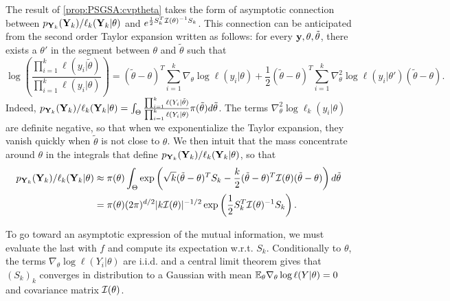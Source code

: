         The result of \cref{prop:PSGSA:cvptheta} takes the form of asymptotic connection between $p_{\mathbf{Y}_k}(\mathbf{Y}_k)/\ell_k(\mathbf{Y}_k|\theta) $ and $e^{\frac{1}{2}S_k^T\mathcal{I}(\theta)^{-1}S_k}$. This connection can be anticipated from the second order Taylor expansion written as follows: for every $\mathbf{y},\theta, \tilde\theta$, there exists a $\theta'$ in the segment between $\theta$ and $\tilde\theta$ such that
        \begin{equation}
            \log\left(\frac{\prod_{i=1}^k \ell(y_i|\tilde\theta)}{\prod_{i=1}^k \ell(y_i|\theta)}\right) = (\tilde\theta-\theta)^T\sum_{i=1}^k\nabla_\theta\log \ell(y_i|\theta) +\frac{1}{2}(\tilde\theta-\theta)^T\sum_{i=1}^k\nabla_\theta^2\log \ell(y_i|\theta')(\tilde\theta-\theta).
        \end{equation}
        Indeed, $p_{\mathbf{Y}_k}(\mathbf{Y}_k)/\ell_k(\mathbf{Y}_k|\theta) = \int_\Theta \frac{\prod_{i=1}^k \ell(Y_i|\tilde\theta)}{\prod_{i=1}^k \ell(Y_i|\theta)} \pi(\tilde\theta)d\tilde\theta$.
        The terms $\nabla_\theta^2\log\ell_k(y_i|\theta)$ are definite negative, so that when we exponentialize the Taylor expansion, they vanish quickly when $\tilde\theta$ is not close to $\theta$.
        We then intuit that the mass concentrate around $\theta$ in the integrals that define $p_{\mathbf{Y}_k}(\mathbf{Y}_k)/\ell_k(\mathbf{Y}_k|\theta)$, so that
            \begin{equation}
                \begin{aligned}
                p_{\mathbf{Y}_k}(\mathbf{Y}_k)/\ell_k(\mathbf{Y}_k|\theta) &\approx \pi(\theta)\int_\Theta\exp\left(\sqrt{k}(\tilde\theta-\theta)^TS_k - \frac{k}{2} (\tilde\theta-\theta)^T\mathcal{I}(\theta)(\tilde\theta-\theta)  \right)d\tilde\theta\\ 
                &= \pi(\theta)(2\pi)^{d/2}|k\mathcal{I}(\theta)|^{-1/2}\exp\left(\frac{1}{2}S_k^T\mathcal{I}(\theta)^{-1}S_k \right).
                \end{aligned}
            \end{equation} 


        To go toward an asymptotic expression of the mutual information, we must evaluate the last with $f$ and compute its expectation w.r.t. $S_k$.
        Conditionally to $\theta$, the terms $\nabla_\theta\log\ell(Y_i|\theta)$ are i.i.d. and a central limit theorem gives that $(S_k)_k$ converges in distribution to a Gaussian with mean $\mathbb{E}_{\theta}\nabla_\theta\log\ell(Y|\theta)=0$ and covariance matrix $\mathcal{I}(\theta)$.
        
